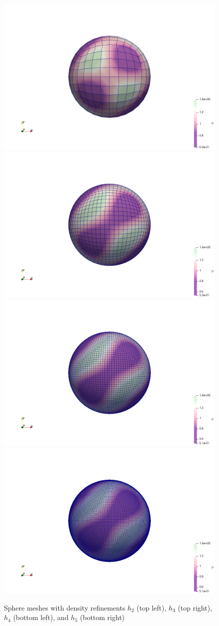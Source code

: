 \documentclass[12pt]{article}
\begin{document}
\begin{figure}[H]\label{fig:mesh density}
	\includegraphics[width=.5\linewidth, trim= 10cm 5cm 10cm 5cm, clip]{images/ref2.png}
	\includegraphics[width=.5\linewidth, trim= 10cm 5cm 10cm 5cm, clip]{images/ref3.png}
	\includegraphics[width=.5\linewidth, trim= 10cm 5cm 10cm 5cm, clip]{images/ref4.png}
	\includegraphics[width=.5\linewidth, trim= 10cm 5cm 10cm 5cm, clip]{images/ref5.png}
	\caption{Sphere meshes with density refinements $h_2$ (top left), $h_3$ (top right), $h_4$ (bottom left), and $h_5$ (bottom right) }\label{fig:mesh_density}
\end{figure}
\end{document}
